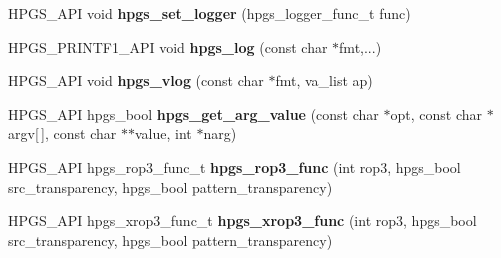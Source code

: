 \begin{DoxyCompactItemize}
\item 
HPGS\_\-API void {\bf hpgs\_\-set\_\-logger} (hpgs\_\-logger\_\-func\_\-t func)
\item 
HPGS\_\-PRINTF1\_\-API void {\bf hpgs\_\-log} (const char $\ast$fmt,...)
\item 
HPGS\_\-API void {\bf hpgs\_\-vlog} (const char $\ast$fmt, va\_\-list ap)
\item 
HPGS\_\-API hpgs\_\-bool {\bf hpgs\_\-get\_\-arg\_\-value} (const char $\ast$opt, const char $\ast$argv[$\,$], const char $\ast$$\ast$value, int $\ast$narg)
\item 
HPGS\_\-API hpgs\_\-rop3\_\-func\_\-t {\bfseries hpgs\_\-rop3\_\-func} (int rop3, hpgs\_\-bool src\_\-transparency, hpgs\_\-bool pattern\_\-transparency)\label{group__base_ga028f514a3b58348a40c435d69749f0fb}

\item 
HPGS\_\-API hpgs\_\-xrop3\_\-func\_\-t {\bfseries hpgs\_\-xrop3\_\-func} (int rop3, hpgs\_\-bool src\_\-transparency, hpgs\_\-bool pattern\_\-transparency)\label{group__base_gaf10e4f96ae58786ee0d86420a2a6d899}


\end{DoxyCompactItemize}

